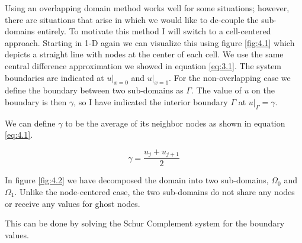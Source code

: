 Using an overlapping domain method works well for some situations; however, there are situations that arise in which we would like to de-couple the sub-domains entirely. To motivate this method I will switch to a cell-centered approach. Starting in 1-D again we can visualize this using figure \ref{fig:4.1} which depicts a straight line with nodes at the center of each cell. We use the same central difference approximation we showed in equation \ref{eq:3.1}. The system boundaries are indicated at $u|_{x=0}$ and $u|_{x=1}$. For the non-overlapping case we define the boundary between two sub-domains as $\Gamma$. The value of $u$ on the boundary is then $\gamma$, so I have indicated the interior boundary $\Gamma$ at ${u|_{\Gamma} = \gamma}$.



We can define $\gamma$ to be the average of its neighbor nodes as shown in equation \ref{eq:4.1}.

\begin{equation}\label{eq:4.1}
	\gamma = \frac{u_{j} + u_{j+1}}{2}
\end{equation}



In figure \ref{fig:4.2} we have decomposed the domain into two sub-domains, $\Omega_0$ and $\Omega_1$. Unlike the node-centered case, the two sub-domains do not share any nodes or receive any values for ghost nodes.




This can be done by solving the Schur Complement system for the boundary values.